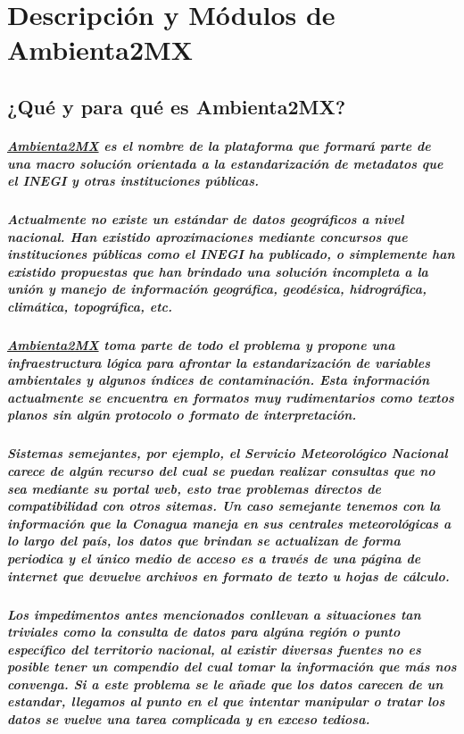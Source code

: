 \chapter {Descripción y Módulos de Ambienta2MX}
  \section {¿Qué y para qué es Ambienta2MX?}
    \paragraph {\underline{Ambienta2MX} es el nombre de la plataforma que formará parte de una macro solución orientada a la estandarización de metadatos que el INEGI y otras instituciones públicas.}
    \paragraph{Actualmente no existe un estándar de datos geográficos a nivel nacional. Han existido aproximaciones mediante concursos que instituciones públicas como el INEGI ha publicado, o simplemente han existido propuestas que han brindado una solución incompleta a la unión y manejo de información geográfica, geodésica, hidrográfica, climática, topográfica, etc.}
    \paragraph{\underline{Ambienta2MX} toma parte de todo el problema y propone una infraestructura lógica para afrontar la estandarización de variables ambientales y algunos índices de contaminación. Esta información actualmente se encuentra en formatos muy rudimentarios como textos planos sin algún protocolo o formato de interpretación.}
    \paragraph{Sistemas semejantes, por ejemplo, el \textbf{Servicio Meteorológico Nacional} carece de algún recurso del cual se puedan realizar consultas que no sea mediante su portal web, esto trae problemas directos de compatibilidad con otros sitemas. Un caso semejante tenemos con la información que la \textbf{Conagua} maneja en sus centrales meteorológicas a lo largo del país, los datos que brindan se actualizan de forma periodica y el único medio de acceso es a través de una página de internet que devuelve archivos en formato de texto u hojas de cálculo.}
    \paragraph{Los impedimentos antes mencionados conllevan a situaciones tan triviales como la consulta de datos para algúna región o punto específico del territorio nacional, al existir diversas fuentes no es posible tener un compendio del cual tomar la información que más nos convenga. Si a este problema se le añade que los datos carecen de un estandar, llegamos al punto en el que intentar manipular o tratar los datos se vuelve una tarea complicada y en exceso tediosa.}
